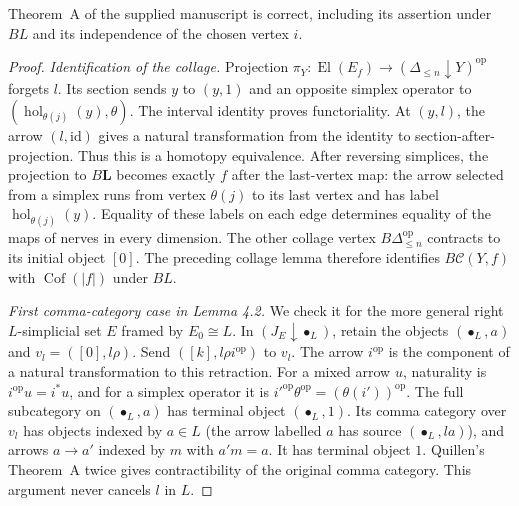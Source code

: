 \begin{proposition}
\label{prop:B-cofiber}
Theorem~A of the supplied manuscript is correct, including its assertion
under $BL$ and its independence of the chosen vertex $i$.
\end{proposition}
\begin{proof}
\emph{Identification of the collage.}  Projection
$\pi_Y:\operatorname{El}(E_f)\to
(\Delta_{\le n}\downarrow Y)^{\mathrm{op}}$ forgets $l$.
Its section sends $y$ to $(y,1)$ and an opposite simplex operator to
$(\operatorname{hol}_{\theta(j)}(y),\theta)$.
The interval identity proves functoriality.  At $(y,l)$, the arrow
$(l,\mathrm{id})$ gives a natural transformation from the identity to
section-after-projection.  Thus this is a homotopy equivalence.
After reversing simplices, the projection to $B\mathbf L$ becomes
exactly $f$ after the last-vertex map: the arrow selected from a simplex
runs from vertex $\theta(j)$ to its last vertex and has label
$\operatorname{hol}_{\theta(j)}(y)$.  Equality of these labels on each
edge determines equality of the maps of nerves in every dimension.
The other collage vertex $B\Delta_{\le n}^{\mathrm{op}}$ contracts
to its initial object $[0]$.  The preceding collage lemma therefore
identifies $B\mathcal C(Y,f)$ with $\operatorname{Cof}(|f|)$ under
$BL$.

\emph{First comma-category case in Lemma 4.2.}  We check it for the
more general right $L$-simplicial set $E$ framed by $E_0\cong L$.
In $(J_E\downarrow\bullet_L)$, retain the objects $(\bullet_L,a)$
and $v_l=([0],l\rho)$.  Send $([k],l\rho i^{\mathrm{op}})$ to
$v_l$.  The arrow $i^{\mathrm{op}}$ is the component of a natural
transformation to this retraction.  For a mixed arrow $u$, naturality
is $i^{\mathrm{op}}u=i^*u$, and for a simplex operator it is
$i'^{\mathrm{op}}\theta^{\mathrm{op}}=(\theta(i'))^{\mathrm{op}}$.
The full subcategory on $(\bullet_L,a)$ has terminal object
$(\bullet_L,1)$.  Its comma category over $v_l$ has objects indexed by
$a\in L$ (the arrow labelled $a$ has source $(\bullet_L,la)$), and
arrows $a\to a'$ indexed by $m$ with $a'm=a$.  It has terminal object
$1$.  Quillen's Theorem~A twice gives contractibility of the original
comma category.  This argument never cancels $l$ in $L$.


\end{proof}
